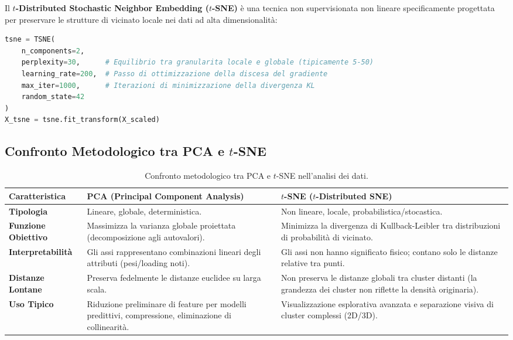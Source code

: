 Il \textbf{$t$-Distributed Stochastic Neighbor Embedding ($t$-SNE)} è una tecnica non supervisionata non lineare specificamente progettata per preservare le strutture di vicinato locale nei dati ad alta dimensionalità:

\begin{lstlisting}[language=Python, style=code]
tsne = TSNE(
    n_components=2,
    perplexity=30,      # Equilibrio tra granularita locale e globale (tipicamente 5-50)
    learning_rate=200,  # Passo di ottimizzazione della discesa del gradiente
    max_iter=1000,      # Iterazioni di minimizzazione della divergenza KL
    random_state=42
)
X_tsne = tsne.fit_transform(X_scaled)
\end{lstlisting}

\FloatBarrier
\subsection{Confronto Metodologico tra PCA e $t$-SNE}

\begin{table}[H]
    \centering
    \small
    \begin{tabularx}{\textwidth}{lXX}
        \toprule
        \textbf{Caratteristica} & \textbf{PCA (Principal Component Analysis)} & \textbf{$t$-SNE ($t$-Distributed SNE)} \\
        \midrule
        \textbf{Tipologia} & Lineare, globale, deterministica. & Non lineare, locale, probabilistica/stocastica. \\
        \addlinespace
        \textbf{Funzione Obiettivo} & Massimizza la varianza globale proiettata (decomposizione agli autovalori). & Minimizza la divergenza di Kullback-Leibler tra distribuzioni di probabilità di vicinato. \\
        \addlinespace
        \textbf{Interpretabilità} & Gli assi rappresentano combinazioni lineari degli attributi (pesi/loading noti). & Gli assi non hanno significato fisico; contano solo le distanze relative tra punti. \\
        \addlinespace
        \textbf{Distanze Lontane} & Preserva fedelmente le distanze euclidee su larga scala. & Non preserva le distanze globali tra cluster distanti (la grandezza dei cluster non riflette la densità originaria). \\
        \addlinespace
        \textbf{Uso Tipico} & Riduzione preliminare di feature per modelli predittivi, compressione, eliminazione di collinearità. & Visualizzazione esplorativa avanzata e separazione visiva di cluster complessi (2D/3D). \\
        \bottomrule
    \end{tabularx}
    \caption{Confronto metodologico tra PCA e $t$-SNE nell'analisi dei dati.}
    \label{tab:dm-pca-vs-tsne}
\end{table}

